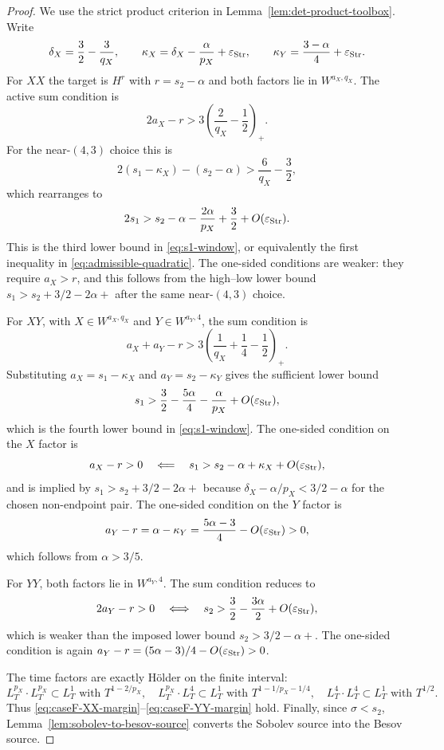 \documentclass[10pt]{amsart}
\numberwithin{equation}{section}
\theoremstyle{plain}
\theoremstyle{definition}
\theoremstyle{remark}
\newcommand{\eps}{\varepsilon}
\begin{document}
\begin{proof}
We use the strict product criterion in Lemma~\ref{lem:det-product-toolbox}.  Write
\[
        \delta_X=\frac32-\frac3{q_X},\qquad
        \kappa_X=\delta_X-\frac\alpha{p_X}+\eps_{\rm Str},
        \qquad
        \kappa_Y=\frac{3-\alpha}{4}+\eps_{\rm Str}.
\]
For $XX$ the target is $H^r$ with $r=s_2-\alpha$ and both factors lie in $W^{a_X,q_X}$.  The active sum condition is
\[
        2a_X-r>3\left(\frac2{q_X}-\frac12\right)_+.
\]
For the near-$(4,3)$ choice this is
\[
        2(s_1-\kappa_X)-(s_2-\alpha)>
        \frac6{q_X}-\frac32,
\]
which rearranges to
\[
        2s_1>s_2-\alpha-\frac{2\alpha}{p_X}+\frac32+O(\eps_{\rm Str}).
\]
This is the third lower bound in \eqref{eq:s1-window}, or equivalently the first inequality in \eqref{eq:admissible-quadratic}.  The one-sided conditions are weaker: they require $a_X>r$, and this follows from the high--low lower bound $s_1>s_2+3/2-2\alpha+$ after the same near-$(4,3)$ choice.

For $XY$, with $X\in W^{a_X,q_X}$ and $Y\in W^{a_Y,4}$, the sum condition is
\[
        a_X+a_Y-r>3\left(\frac1{q_X}+\frac14-\frac12\right)_+.
\]
Substituting $a_X=s_1-\kappa_X$ and $a_Y=s_2-\kappa_Y$ gives the sufficient lower bound
\[
        s_1>\frac32-\frac{5\alpha}{4}-\frac\alpha{p_X}+O(\eps_{\rm Str}),
\]
which is the fourth lower bound in \eqref{eq:s1-window}.  The one-sided condition on the $X$ factor is
\[
        a_X-r>0
        \quad\Longleftarrow\quad
        s_1>s_2-\alpha+\kappa_X+O(\eps_{\rm Str}),
\]
and is implied by $s_1>s_2+3/2-2\alpha+$ because $\delta_X-\alpha/p_X<3/2-\alpha$ for the chosen non-endpoint pair.  The one-sided condition on the $Y$ factor is
\[
        a_Y-r=\alpha-\kappa_Y=\frac{5\alpha-3}{4}-O(\eps_{\rm Str})>0,
\]
which follows from $\alpha>3/5$.

For $YY$, both factors lie in $W^{a_Y,4}$.  The sum condition reduces to
\[
        2a_Y-r>0
        \quad\Longleftrightarrow\quad
        s_2>\frac32-\frac{3\alpha}{2}+O(\eps_{\rm Str}),
\]
which is weaker than the imposed lower bound $s_2>3/2-\alpha+$.  The one-sided condition is again $a_Y-r=(5\alpha-3)/4-O(\eps_{\rm Str})>0$.

The time factors are exactly H\"older on the finite interval:
\[
        L_T^{p_X}\cdot L_T^{p_X}\subset L_T^1
        \text{ with }T^{1-2/p_X},\quad
        L_T^{p_X}\cdot L_T^4\subset L_T^1
        \text{ with }T^{1-1/p_X-1/4},\quad
        L_T^4\cdot L_T^4\subset L_T^1
        \text{ with }T^{1/2}.
\]
Thus \eqref{eq:caseF-XX-margin}--\eqref{eq:caseF-YY-margin} hold.  Finally, since $\sigma<s_2$, Lemma~\ref{lem:sobolev-to-besov-source} converts the Sobolev source into the Besov source.
\end{proof}
\end{document}
